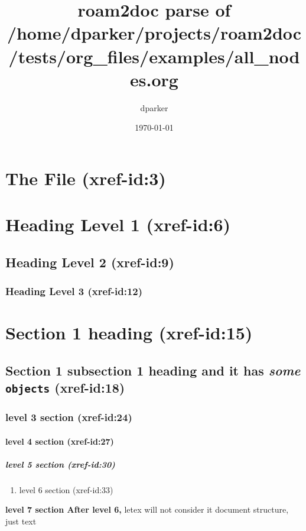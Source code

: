 \documentclass[11pt]{article}
\author{dparker}
\date{\today}
\title{roam2doc parse of /home/dparker/projects/roam2doc/tests/org\_files/examples/all\_nodes.org}
\begin{document}
\maketitle
\tableofcontents
\clearpage
\section{The File   (xref-id:3)  }
 \label{obj-3}
 \label{obj-2}
\section{Heading Level 1   (xref-id:6)  }
 \label{obj-6}
 \label{obj-5}
\subsection{Heading Level 2   (xref-id:9)  }
 \label{obj-9}
 \label{obj-8}
\subsubsection{Heading Level 3   (xref-id:12)  }
 \label{obj-12}
 \label{obj-11}
\section{Section 1 heading   (xref-id:15)  }
 \label{obj-15}
 \label{obj-14}
\subsection{Section 1 subsection 1 heading and it has \textbf{\emph{some}} \texttt{objects}   (xref-id:18)  }
 \label{obj-18}
 \label{obj-17}
\subsubsection{level 3 section   (xref-id:24)  }
 \label{obj-24}
 \label{obj-23}
\paragraph{level 4 section   (xref-id:27)  }
 \label{obj-27}
 \label{obj-26}
\subparagraph{level 5 section   (xref-id:30)  }
 \label{obj-30}
 \label{obj-29}
\begin{enumerate}
\item level 6 section   (xref-id:33) 
 \label{obj-33}
 \label{obj-32}
\end{enumerate}
\textbf{level 7 section After level 6,}\newline
letex will not consider it document structure, just text
\vspace{\baselineskip}
\end{document}
